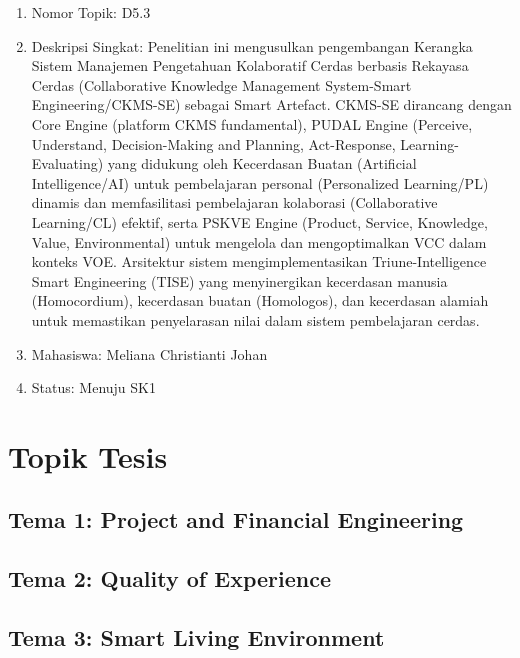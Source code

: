 \documentclass[
  letterpaper,
  DIV=11,
  numbers=noendperiod]{scrreprt}
\providecommand{\tightlist}{%
  \setlength{\itemsep}{0pt}\setlength{\parskip}{0pt}}
\begin{document}
\begin{enumerate}
  \begin{enumerate}
  \def\labelenumii{\arabic{enumii}.}
  \tightlist
  \item
    Nomor Topik: D5.3
  \item
    Deskripsi Singkat: Penelitian ini mengusulkan pengembangan Kerangka
    Sistem Manajemen Pengetahuan Kolaboratif Cerdas berbasis Rekayasa
    Cerdas (Collaborative Knowledge Management System-Smart
    Engineering/CKMS-SE) sebagai Smart Artefact. CKMS-SE dirancang
    dengan Core Engine (platform CKMS fundamental), PUDAL Engine
    (Perceive, Understand, Decision-Making and Planning, Act-Response,
    Learning-Evaluating) yang didukung oleh Kecerdasan Buatan
    (Artificial Intelligence/AI) untuk pembelajaran personal
    (Personalized Learning/PL) dinamis dan memfasilitasi pembelajaran
    kolaborasi (Collaborative Learning/CL) efektif, serta PSKVE Engine
    (Product, Service, Knowledge, Value, Environmental) untuk mengelola
    dan mengoptimalkan VCC dalam konteks VOE. Arsitektur sistem
    mengimplementasikan Triune-Intelligence Smart Engineering (TISE)
    yang menyinergikan kecerdasan manusia (Homocordium), kecerdasan
    buatan (Homologos), dan kecerdasan alamiah untuk memastikan
    penyelarasan nilai dalam sistem pembelajaran cerdas.
  \item
    Mahasiswa: Meliana Christianti Johan
  \item
    Status: Menuju SK1
  \end{enumerate}
\end{enumerate}


\chapter{Topik Tesis}\label{topik-tesis}

\section{Tema 1: Project and Financial
Engineering}\label{tema-1-project-and-financial-engineering-1}

\section{Tema 2: Quality of
Experience}\label{tema-2-quality-of-experience-1}

\section{Tema 3: Smart Living
Environment}\label{tema-3-smart-living-environment-1}
\end{document}
